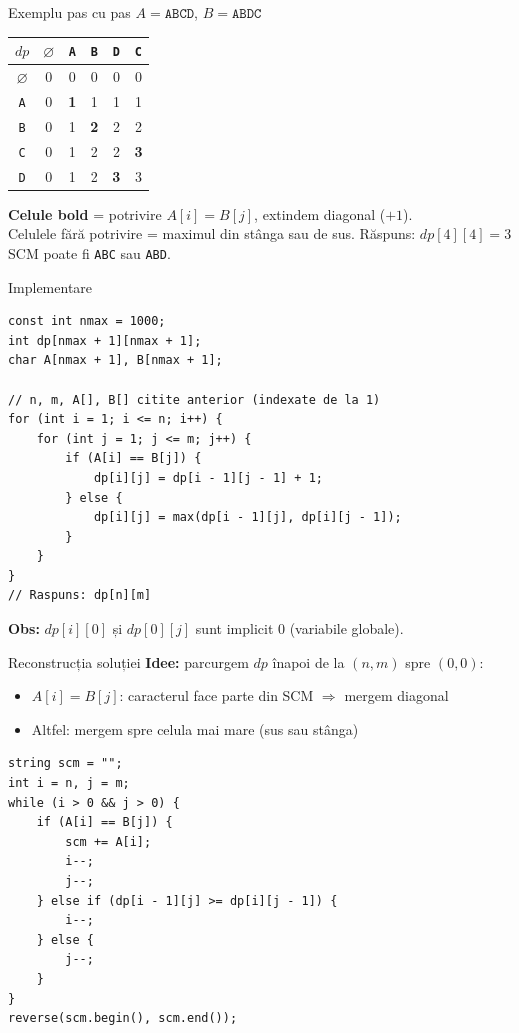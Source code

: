 \documentclass[10pt]{beamer}
\begin{document}
\begin{frame}{Exemplu pas cu pas}
  $A = \texttt{ABCD}$, $B = \texttt{ABDC}$
  \begin{center}
  {\small
  \begin{tabular}{c|ccccc}
    \toprule
    $dp$ & $\varnothing$ & \texttt{A} & \texttt{B} & \texttt{D} & \texttt{C} \\
    \midrule
    $\varnothing$ & 0 & 0 & 0 & 0 & 0 \\
    \texttt{A}    & 0 & \textbf{1} & 1 & 1 & 1 \\
    \texttt{B}    & 0 & 1 & \textbf{2} & 2 & 2 \\
    \texttt{C}    & 0 & 1 & 2 & 2 & \textbf{3} \\
    \texttt{D}    & 0 & 1 & 2 & \textbf{3} & 3 \\
    \bottomrule
  \end{tabular}}
  \end{center}
  \smallskip
  \textbf{Celule bold} = potrivire $A[i]=B[j]$, extindem diagonal ($+1$).\\
  Celulele fără potrivire = maximul din stânga sau de sus.
  \smallskip
  Răspuns: $dp[4][4] = 3$ \textemdash{} SCM poate fi \texttt{ABC} sau \texttt{ABD}.
\end{frame}

\begin{frame}[fragile]{Implementare}
  \begin{lstlisting}
const int nmax = 1000;
int dp[nmax + 1][nmax + 1];
char A[nmax + 1], B[nmax + 1];

// n, m, A[], B[] citite anterior (indexate de la 1)
for (int i = 1; i <= n; i++) {
    for (int j = 1; j <= m; j++) {
        if (A[i] == B[j]) {
            dp[i][j] = dp[i - 1][j - 1] + 1;
        } else {
            dp[i][j] = max(dp[i - 1][j], dp[i][j - 1]);
        }
    }
}
// Raspuns: dp[n][m]
  \end{lstlisting}
  \textbf{Obs:} $dp[i][0]$ și $dp[0][j]$ sunt implicit $0$ (variabile globale).
\end{frame}

\begin{frame}[fragile]{Reconstrucția soluției}
  \textbf{Idee:} parcurgem $dp$ înapoi de la $(n, m)$ spre $(0, 0)$:
  \begin{itemize}\itemsep1pt
    \item $A[i]=B[j]$: caracterul face parte din SCM $\Rightarrow$ mergem diagonal
    \item Altfel: mergem spre celula mai mare (sus sau stânga)
  \end{itemize}
  \begin{lstlisting}
string scm = "";
int i = n, j = m;
while (i > 0 && j > 0) {
    if (A[i] == B[j]) {
        scm += A[i];
        i--;
        j--;
    } else if (dp[i - 1][j] >= dp[i][j - 1]) {
        i--;
    } else {
        j--;
    }
}
reverse(scm.begin(), scm.end());
  \end{lstlisting}
\end{frame}
\end{document}
